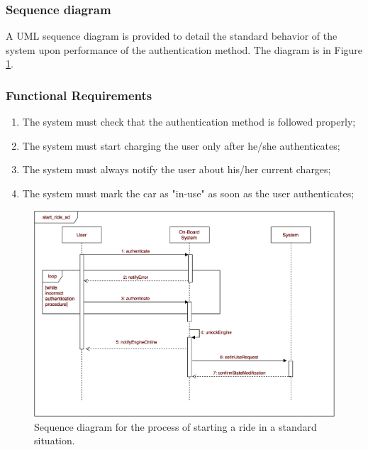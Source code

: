 \subsubsection{Sequence diagram}
A UML sequence diagram is provided to detail the standard behavior of the system upon performance of the authentication method. The diagram is in Figure \ref{start_sd}.

\subsubsection{Functional Requirements}
\begin{enumerate}
\item The system must check that the authentication method is followed properly;
\item The system must start charging the user only after he/she authenticates;
\item The system must always notify the user about his/her current charges;
\item The system must mark the car as "in-use" as soon as the user authenticates;
\end{enumerate}

\begin{figure}[H]
\begin{center}
		\includegraphics[width=\textwidth]{./specific_requirements/features/diagrams/start_ride_sd.png}
		\caption{Sequence diagram for the process of starting a ride in a standard situation.}
		\label{start_sd}
\end{center}
\end{figure}

